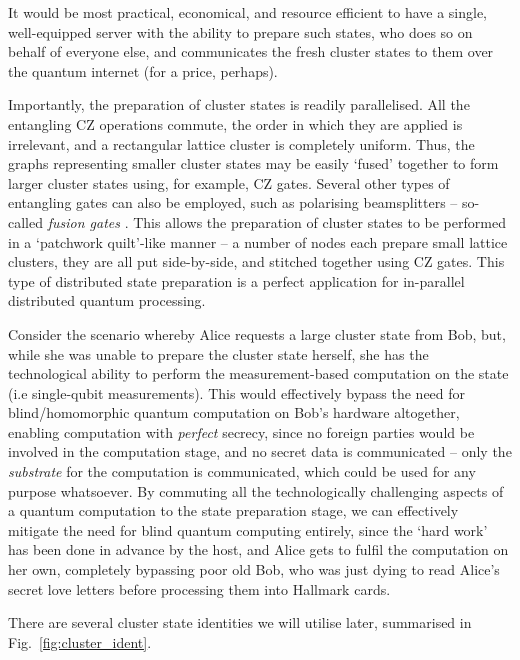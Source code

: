 \documentclass[aps,rmp,twocolumn,amsmath,amssymb,nofootinbib,superscriptaddress,longbibliography,floatfix,table-of-contents,eqsecnum]{revtex4-1}
\begin{document}
It would be most practical, economical, and resource efficient to have a single, well-equipped server with the ability to prepare such states, who does so on behalf of everyone else, and communicates the fresh cluster states to them over the quantum internet (for a price, perhaps).

Importantly, the preparation of cluster states is readily parallelised. All the entangling CZ operations commute, the order in which they are applied is irrelevant, and a rectangular lattice cluster is completely uniform. Thus, the graphs representing smaller cluster states may be easily `fused' together to form larger cluster states using, for example, CZ gates. Several other types of entangling gates can also be employed, such as polarising beamsplitters -- so-called \textit{fusion gates} \cite{bib:BrowneRudolph05}. This allows the preparation of cluster states to be performed in a `patchwork quilt'-like manner -- a number of nodes each prepare small lattice clusters, they are all put side-by-side, and stitched together using CZ gates. This type of distributed state preparation is a perfect application for in-parallel distributed quantum processing.

Consider the scenario whereby Alice requests a large cluster state from Bob, but, while she was unable to prepare the cluster state herself, she has the technological ability to perform the measurement-based computation on the state (i.e single-qubit measurements). This would effectively bypass the need for blind/homomorphic quantum computation on Bob's hardware altogether, enabling computation with \textit{perfect} secrecy, since no foreign parties would be involved in the computation stage, and no secret data is communicated -- only the \textit{substrate} for the computation is communicated, which could be used for any purpose whatsoever. By commuting all the technologically challenging aspects of a quantum computation to the state preparation stage, we can effectively mitigate the need for blind quantum computing entirely, since the `hard work' has been done in advance by the host, and Alice gets to fulfil the computation on her own, completely bypassing poor old Bob, who was just dying to read Alice's secret love letters before processing them into Hallmark cards.

There are several cluster state identities we will utilise later, summarised in Fig.~\ref{fig:cluster_ident}.
\end{document}
